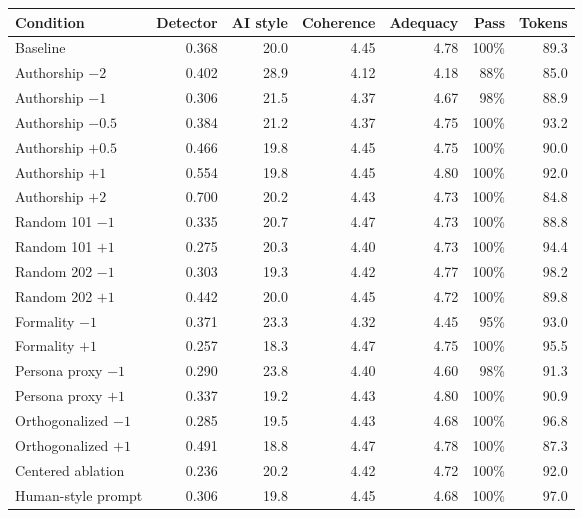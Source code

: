 \begin{tabular}{lrrrrrr}
\toprule
Condition & Detector & AI style & Coherence & Adequacy & Pass & Tokens \\
\midrule
Baseline & 0.368 & 20.0 & 4.45 & 4.78 & 100\% & 89.3 \\
Authorship $-2$ & 0.402 & 28.9 & 4.12 & 4.18 & 88\% & 85.0 \\
Authorship $-1$ & 0.306 & 21.5 & 4.37 & 4.67 & 98\% & 88.9 \\
Authorship $-0.5$ & 0.384 & 21.2 & 4.37 & 4.75 & 100\% & 93.2 \\
Authorship $+0.5$ & 0.466 & 19.8 & 4.45 & 4.75 & 100\% & 90.0 \\
Authorship $+1$ & 0.554 & 19.8 & 4.45 & 4.80 & 100\% & 92.0 \\
Authorship $+2$ & 0.700 & 20.2 & 4.43 & 4.73 & 100\% & 84.8 \\
Random 101 $-1$ & 0.335 & 20.7 & 4.47 & 4.73 & 100\% & 88.8 \\
Random 101 $+1$ & 0.275 & 20.3 & 4.40 & 4.73 & 100\% & 94.4 \\
Random 202 $-1$ & 0.303 & 19.3 & 4.42 & 4.77 & 100\% & 98.2 \\
Random 202 $+1$ & 0.442 & 20.0 & 4.45 & 4.72 & 100\% & 89.8 \\
Formality $-1$ & 0.371 & 23.3 & 4.32 & 4.45 & 95\% & 93.0 \\
Formality $+1$ & 0.257 & 18.3 & 4.47 & 4.75 & 100\% & 95.5 \\
Persona proxy $-1$ & 0.290 & 23.8 & 4.40 & 4.60 & 98\% & 91.3 \\
Persona proxy $+1$ & 0.337 & 19.2 & 4.43 & 4.80 & 100\% & 90.9 \\
Orthogonalized $-1$ & 0.285 & 19.5 & 4.43 & 4.68 & 100\% & 96.8 \\
Orthogonalized $+1$ & 0.491 & 18.8 & 4.47 & 4.78 & 100\% & 87.3 \\
Centered ablation & 0.236 & 20.2 & 4.42 & 4.72 & 100\% & 92.0 \\
Human-style prompt & 0.306 & 19.8 & 4.45 & 4.68 & 100\% & 97.0 \\
\bottomrule
\end{tabular}
